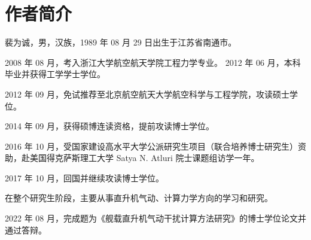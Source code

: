 \documentclass[doctor,openright,twoside,color,AutoFakeBold=true]{buaathesis}
\theoremstyle{plain}
\theoremstyle{plain}
\theoremstyle{plain}
\theoremstyle{plain}
\theoremstyle{plain}
\theoremstyle{plain}
\theoremstyle{plain}
\theoremstyle{plain}
\theoremstyle{plain}
\theoremstyle{plain}
\theoremstyle{plain}
\theoremstyle{plain}
\theoremstyle{definition}
\theoremstyle{definition}
\theoremstyle{definition}
\theoremstyle{definition}
\theoremstyle{definition}
\theoremstyle{definition}
\theoremstyle{remark}
\theoremstyle{remark}
\theoremstyle{remark}
\theoremstyle{remark}
\theoremstyle{remark}
\theoremstyle{problem}
\begin{document}
\maketitle
\pagestyle{frontmatter}


\makeatletter
\@openrightfalse
\makeatother

{}
\tableofcontents

\begingroup %

\renewcommand\citet[2][]{}
\renewcommand\cite[2][]{}
\renewcommand\upcite[2][]{}


\listoffigures

\listoftables

\endgroup %

\printnomenclature

\makeatletter
\@openrighttrue
\makeatother

\mainmatter
\pagestyle{mainmatter}




\cleardoublepage
{}
{}

\cleardoublepage

\appendix
% 

\backmatter




\chapter{作者简介}
裴为诚，男，汉族，1989 年 08 月 29 日出生于江苏省南通市。

2008 年 08 月，考入浙江大学航空航天学院工程力学专业。
2012 年 06 月，本科毕业并获得工学学士学位。

2012 年 09 月，免试推荐至北京航空航天大学航空科学与工程学院，攻读硕士学位。

2014 年 09 月，获得硕博连读资格，提前攻读博士学位。

2016 年 10 月，受国家建设高水平大学公派研究生项目（联合培养博士研究生）资助，赴美国得克萨斯理工大学 Satya N. Atluri 院士课题组访学一年。

2017 年 10 月，回国并继续攻读博士学位。

在整个研究生阶段，主要从事直升机气动、计算力学方向的学习和研究。

2022 年 08 月，完成题为《舰载直升机气动干扰计算方法研究》的博士学位论文并通过答辩。
\end{document}
